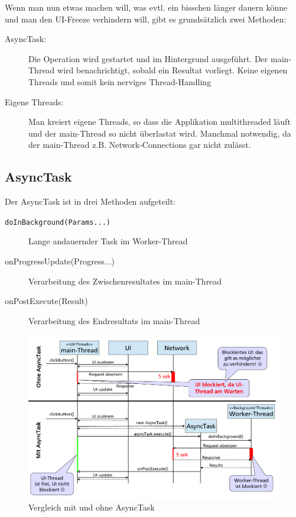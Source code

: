 \documentclass[a4paper, 11pt]{article}
\newcommand{\code}[1]{\texttt{#1}}
\begin{document}
Wenn man nun etwas machen will, was evtl. ein bisschen länger dauern könne und man den UI-Freeze verhindern will, gibt es grundsätzlich zwei Methoden:

\begin{description}
	\item[AsyncTask: ] Die Operation wird gestartet und im Hintergrund ausgeführt. Der main-Thread wird benachrichtigt, sobald ein Resultat vorliegt. Keine eigenen Threads und somit kein nerviges Thread-Handling
	\item[Eigene Threads: ] Man kreiert eigene Threads, so dass die Applikation multithreaded läuft und der main-Thread so nicht überlastat wird. Manchmal notwendig, da der main-Thread z.B. Network-Connections gar nicht zulässt.
\end{description}

\subsection{AsyncTask}
Der AsyncTask ist in drei Methoden aufgeteilt:

\begin{description}
	\item[\code{doInBackground(Params...)}] Lange andauernder Task im Worker-Thread
	\item[onProgressUpdate(Progress...)] Verarbeitung des Zwischenresultates im main-Thread
	\item[onPostExecute(Result)] Verarbeitung des Endresultats im main-Thread
\end{description}

\begin{figure}[htb]
	\centering
	\includegraphics[keepaspectratio=true,height=15\baselineskip]{asynctask}
	\caption{Vergleich mit und ohne AsyncTask}
	\label{fig:asynctask}
\end{figure}
\end{document}
